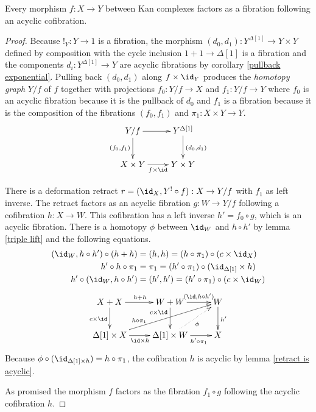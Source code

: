 \documentclass{tac}
\newcommand\bang{!}
\newcommand\of{:}
\newcommand\simplex\Delta
\begin{document}
\begin{proposition} Every morphism $f\of X\to Y$ between Kan complexes factors as a fibration following an acyclic cofibration. \label{factor2} \end{proposition}

\begin{proof} Because $\bang_Y\of Y\to 1$ is a fibration, the morphism $(d_0,d_1)\of Y^{\simplex[1]} \to Y\times Y$ defined by composition with the cycle inclusion $1+1\to \simplex[1]$ is a fibration and the components $d_i\of Y^{\simplex[1]}\to Y$ are acyclic fibrations by corollary \ref{pullback exponential}. Pulling back $(d_0,d_1)$ along $f\times \id_Y$ produces the \emph{homotopy graph} $Y/f$ of $f$ together with projections $f_0\of Y/f\to X$ and $f_1\of Y/f\to Y$ where $f_0$ is an acyclic fibration because it is the pullback of $d_0$ and $f_1$ is a fibration because it is the composition of the fibrations $(f_0,f_1)$ and $\pi_1\of X\times Y\to Y$.
\[\xymatrix{
Y/f \ar[r]\ar[d]_{(f_0,f_1)} & Y^{\simplex[1]} \ar[d]^{(d_0,d_1)} \\
X\times Y \ar[r]_{f\times\id} & Y\times Y
}\]

There is a deformation retract $r=(\id_X,Y^\bang\circ f)\of X\to Y/f$ with $f_1$ as left inverse. The retract factors as an acyclic fibration $g\of W\to Y/f$ following a cofibration $h\of X\to W$. This cofibration has a left inverse $h' = f_0\circ g$, which is an acyclic fibration. There is a homotopy $\phi$ between $\id_{W}$ and $h\circ h'$ by lemma \ref{triple lift} and the following equations.
\begin{align*}
(\id_W,h\circ h')\circ(h+h)&=(h,h)= (h\circ\pi_1)\circ (c\times \id_X)\\
h'\circ h\circ \pi_1&=\pi_1=(h'\circ\pi_1)\circ(\id_{\simplex[1]}\times h)\\
h'\circ(\id_W,h\circ h')&=(h',h')= (h'\circ\pi_1)\circ (c\times \id_W)
\end{align*}
\[\xymatrix{
X+X\ar[d]_{c\times \id}\ar[r]^{h+h} & W+W\ar[d]_(.3){c\times \id}\ar[r]^(.6){(\id,h\circ h')} & W\ar[d]^{h'}\\
\simplex[1]\times X\ar[r]_{\id\times h} \ar[urr]^(.3){h\circ\pi_1}  & \simplex[1]\times W\ar[r]_(.6){h'\circ\pi_1} \ar@{.>}[ur]_\phi & X
}\]
Because $\phi\circ(\id_{\simplex[1]\times h}) = h\circ \pi_1$, the cofibration $h$ is acyclic by lemma \ref{retract is acyclic}. 

As promised the morphism $f$ factors as the fibration $f_1\circ g$ following the acyclic cofibration $h$.
\end{proof}
\end{document}
